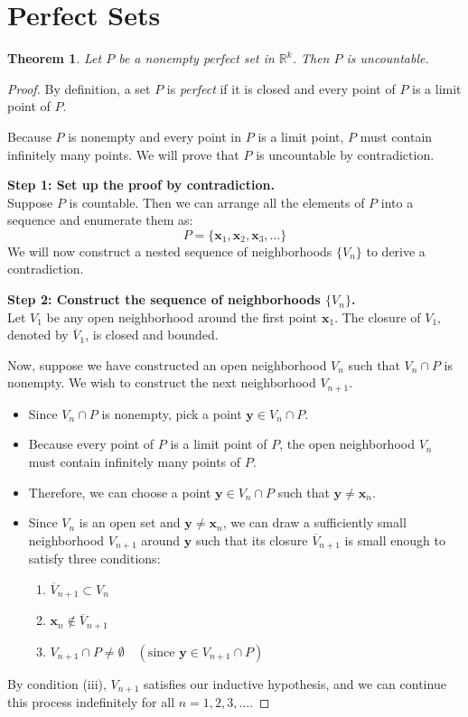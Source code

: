 \documentclass{article}
\theoremstyle{mythm}
\newtheorem{theorem}{Theorem}[section]
\begin{document}
\section*{Perfect Sets}

\begin{theorem}
Let $P$ be a nonempty perfect set in $\mathbb{R}^k$. Then $P$ is uncountable.
\end{theorem}

\begin{proof}
By definition, a set $P$ is \textit{perfect} if it is closed and every point of $P$ is a limit point of $P$. 

Because $P$ is nonempty and every point in $P$ is a limit point, $P$ must contain infinitely many points. We will prove that $P$ is uncountable by contradiction.

\textbf{Step 1: Set up the proof by contradiction.} \\
Suppose $P$ is countable. Then we can arrange all the elements of $P$ into a sequence and enumerate them as:
\[ P = \{\mathbf{x}_1, \mathbf{x}_2, \mathbf{x}_3, \dots\} \]
We will now construct a nested sequence of neighborhoods $\{V_n\}$ to derive a contradiction.

\textbf{Step 2: Construct the sequence of neighborhoods $\{V_n\}$.} \\
Let $V_1$ be any open neighborhood around the first point $\mathbf{x}_1$. The closure of $V_1$, denoted by $\overline{V}_1$, is closed and bounded.

Now, suppose we have constructed an open neighborhood $V_n$ such that $V_n \cap P$ is nonempty. We wish to construct the next neighborhood $V_{n+1}$.
\begin{itemize}
    \item Since $V_n \cap P$ is nonempty, pick a point $\mathbf{y} \in V_n \cap P$.
    \item Because every point of $P$ is a limit point of $P$, the open neighborhood $V_n$ must contain infinitely many points of $P$.
    \item Therefore, we can choose a point $\mathbf{y} \in V_n \cap P$ such that $\mathbf{y} \neq \mathbf{x}_n$.
    \item Since $V_n$ is an open set and $\mathbf{y} \neq \mathbf{x}_n$, we can draw a sufficiently small neighborhood $V_{n+1}$ around $\mathbf{y}$ such that its closure $\overline{V}_{n+1}$ is small enough to satisfy three conditions:
    \begin{enumerate}[label=(\roman*)]
        \item $\overline{V}_{n+1} \subset V_n$
        \item $\mathbf{x}_n \notin \overline{V}_{n+1}$
        \item $V_{n+1} \cap P \neq \emptyset \quad (\text{since } \mathbf{y} \in V_{n+1} \cap P)$
    \end{enumerate}
\end{itemize}
By condition (iii), $V_{n+1}$ satisfies our inductive hypothesis, and we can continue this process indefinitely for all $n = 1, 2, 3, \dots$.


\end{proof}
\end{document}
